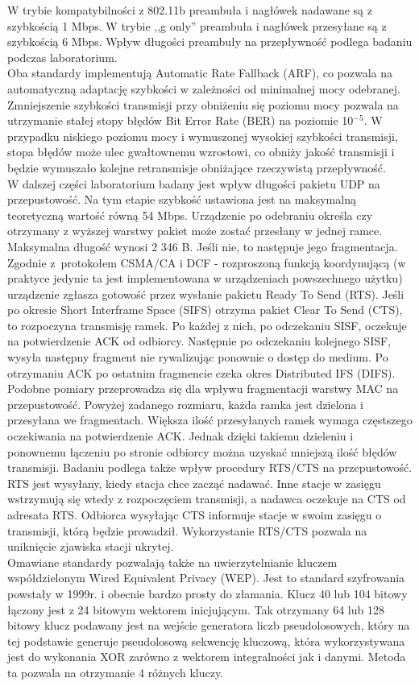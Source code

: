 \documentclass[12pt, a4paper, oneside]{article}
\begin{document}
\indent W trybie kompatybilności z 802.11b preambuła i nagłówek nadawane są z szybkością 1 Mbps. W trybie ,,g only'' preambuła i nagłówek przesyłane są z szybkością 6 Mbps. Wpływ długości preambuły na przepływność podlega badaniu podczas laboratorium.\\
\indent Oba standardy implementują Automatic Rate Fallback (ARF), co pozwala na automatyczną adaptację szybkości w zależności od minimalnej mocy odebranej. Zmniejszenie szybkości transmisji przy obniżeniu się poziomu mocy pozwala na utrzymanie stałej stopy błędów Bit Error Rate (BER) na poziomie 10$^{-5}$. W przypadku niskiego poziomu mocy i wymuszonej wysokiej szybkości transmisji, stopa błędów może ulec gwałtownemu wzrostowi, co obniży jakość transmisji i będzie wymuszało kolejne retransmisje obniżające rzeczywistą przepływność.\\
\indent W dalszej części laboratorium badany jest wpływ długości pakietu UDP na przepustowość. Na tym etapie szybkość ustawiona jest na maksymalną teoretyczną wartość równą 54 Mbps. Urządzenie po odebraniu określa czy otrzymany z wyższej warstwy pakiet może zostać przesłany w jednej ramce. Maksymalna długość wynosi 2 346 B. Jeśli nie, to następuje jego fragmentacja. Zgodnie z~protokołem CSMA/CA i DCF - rozproszoną funkcją koordynującą (w praktyce jedynie ta jest implementowana w urządzeniach powszechnego użytku) urządzenie zgłasza gotowość przez wysłanie pakietu Ready To Send (RTS). Jeśli po okresie Short Interframe Space (SIFS) otrzyma pakiet Clear To Send (CTS), to rozpoczyna transmisję ramek. Po każdej z nich, po odczekaniu SISF, oczekuje na potwierdzenie ACK od odbiorcy. Następnie po odczekaniu kolejnego SISF, wysyła następny fragment nie rywalizując ponownie o dostęp do medium. Po otrzymaniu ACK po ostatnim fragmencie czeka okres Distributed IFS (DIFS).\\
\indent Podobne pomiary przeprowadza się dla wpływu fragmentacji warstwy MAC na przepustowość. Powyżej zadanego rozmiaru, każda ramka jest dzielona i przesyłana we fragmentach. Większa ilość przesyłanych ramek wymaga częstszego oczekiwania na potwierdzenie ACK. Jednak dzięki takiemu dzieleniu i ponownemu łączeniu po stronie odbiorcy można uzyskać mniejszą ilość błędów transmisji.
\indent Badaniu podlega także wpływ procedury RTS/CTS na przepustowość. RTS jest wysyłany, kiedy stacja chce zacząć nadawać. Inne stacje w zasięgu wstrzymują się wtedy z rozpoczęciem transmisji, a nadawca oczekuje na CTS od adresata RTS. Odbiorca wysyłając CTS informuje stacje w swoim zasięgu o transmisji, którą będzie prowadził. Wykorzystanie RTS/CTS pozwala na uniknięcie zjawiska stacji ukrytej.\\
\indent Omawiane standardy pozwalają także na uwierzytelnianie kluczem współdzielonym Wired Equivalent Privacy (WEP). Jest to standard szyfrowania powstały w 1999r. i obecnie bardzo prosty do złamania. Klucz 40 lub 104 bitowy łączony jest z 24 bitowym wektorem inicjującym. Tak otrzymany 64 lub 128 bitowy klucz podawany jest na wejście generatora liczb pseudolosowych, który na tej podstawie generuje pseudolosową sekwencję kluczową, która wykorzystywana jest do wykonania XOR zarówno z wektorem integralności jak i danymi. Metoda ta pozwala na otrzymanie 4 różnych kluczy.
\end{document}
